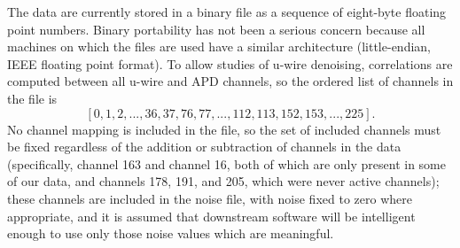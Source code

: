 The data are currently stored in a binary file as a sequence of eight-byte floating point numbers.  Binary portability has not been a serious concern because all machines on which the files are used have a similar architecture (little-endian, IEEE floating point format).  To allow studies of u-wire denoising, correlations are computed between all u-wire and APD channels, so the ordered list of channels in the file is
\begin{equation}\label{eqn:ChannelListingForNoiseFile}
[0,1,2,...,36,37,76,77,...,112,113,152,153,...,225].
\end{equation}
No channel mapping is included in the file, so the set of included channels must be fixed regardless of the addition or subtraction of channels in the data (specifically, channel 163 and channel 16, both of which are only present in some of our data, and channels 178, 191, and 205, which were never active channels); these channels are included in the noise file, with noise fixed to zero where appropriate, and it is assumed that downstream software will be intelligent enough to use only those noise values which are meaningful.

